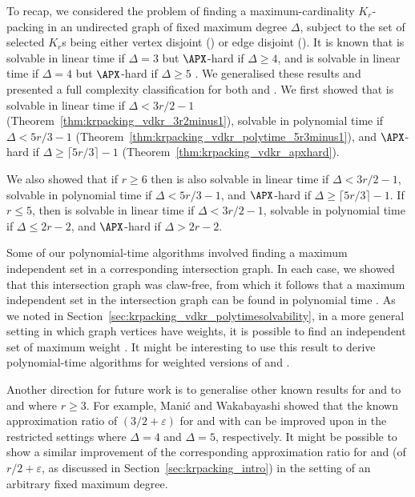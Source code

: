 To recap, we considered the problem of finding a maximum-cardinality $K_r$-packing in an undirected graph of fixed maximum degree $\Delta$, subject to the set of selected $K_r$s being either vertex disjoint (\vdkr) or edge disjoint (\edkr). It is known that \vdkthree is solvable in linear time if $\Delta=3$ but $\APX$-hard if $\Delta \geq 4$, and \edkthree is solvable in linear time if $\Delta=4$ but $\APX$-hard if $\Delta \geq 5$ \cite{caprara_packing_2002}. We generalised these results and presented a full complexity classification for both \vdkr and \edkr. 
We first showed that \vdkr is solvable in linear time if $\Delta < 3r/2 - 1$ (Theorem~\ref{thm:krpacking_vdkr_3r2minus1}), solvable in polynomial time if $\Delta < 5r/3 - 1$ (Theorem~\ref{thm:krpacking_vdkr_polytime_5r3minus1}), and $\APX$-hard if $\Delta \geq \lceil 5r/3 \rceil - 1$ (Theorem~\ref{thm:krpacking_vdkr_apxhard}). 

We also showed that if $r\geq 6$ then \edkr is also solvable in linear time if $\Delta < 3r/2 - 1$, solvable in polynomial time if  $\Delta < 5r/3 - 1$, and $\APX$-hard if $\Delta \geq \lceil 5r/3 \rceil - 1$. If $r \leq 5$, then \edkr is solvable in linear time if $\Delta < 3r/2 - 1$, solvable in polynomial time if $\Delta \leq 2r - 2$, and $\APX$-hard if $\Delta > 2r - 2$.

Some of our polynomial-time algorithms involved finding a maximum independent set in a corresponding intersection graph. In each case, we showed that this intersection graph was claw-free, from which it follows that a maximum independent set in the intersection graph can be found in polynomial time \cite{MINTY1980284,SBIHI198053}. As we noted in 
Section~\ref{sec:krpacking_vdkr_polytimesolvability}, in a more general setting in which graph vertices have weights, it is possible to find an independent set of maximum weight \cite{MINTY1980284,Nakamura01}. It might be interesting to use this result to derive polynomial-time algorithms for weighted versions of \vdkr and \edkr.

Another direction for future work is to generalise other known results for \vdkthree and \edkthree to \vdkr and \edkr where $r \geq 3$. For example, Mani\'c and Wakabayashi \cite{Eurocomb05} showed that the known approximation ratio of $(3/2 + \varepsilon)$ for \vdkthree and \edkthree with can be improved upon in the restricted settings where $\Delta = 4$ and $\Delta = 5$, respectively. It might be possible to show a similar improvement of the corresponding approximation ratio for \vdkr and \edkr (of $r/2 + \varepsilon$, as discussed in Section~\ref{sec:krpacking_intro}) in the setting of an arbitrary fixed maximum degree.


